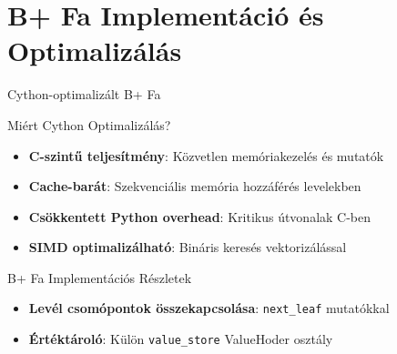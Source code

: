 \documentclass[aspectratio=169]{beamer}
\begin{document}
\section{B+ Fa Implementáció és Optimalizálás}

\begin{frame}{Cython-optimalizált B+ Fa}
\begin{block}{Miért Cython Optimalizálás?}
\begin{itemize}
    \item \textbf{C-szintű teljesítmény}: Közvetlen memóriakezelés és mutatók
    \item \textbf{Cache-barát}: Szekvenciális memória hozzáférés levelekben
    \item \textbf{Csökkentett Python overhead}: Kritikus útvonalak C-ben
    \item \textbf{SIMD optimalizálható}: Bináris keresés vektorizálással
\end{itemize}
\end{block}

\begin{block}{B+ Fa Implementációs Részletek}
\begin{itemize}
    \item \textbf{Levél csomópontok összekapcsolása}: \texttt{next\_leaf} mutatókkal
    \item \textbf{Értéktároló}: Külön \texttt{value\_store} ValueHoder osztály
\end{itemize}
\end{block}
\end{frame}
\end{document}

